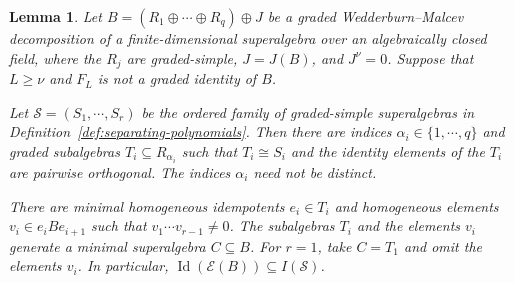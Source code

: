 \documentclass[11pt,reqno]{amsart}
\newcommand{\E}{\mathcal E}
\newcommand{\Id}{\operatorname{Id}}
\newtheorem{lemma}[theorem]{Lemma}
\theoremstyle{definition}
\theoremstyle{remark}
\numberwithin{equation}{section}
\begin{document}
\begin{lemma}\label{lem:extraction}
Let
$B=(R_1\oplus\cdots\oplus R_q)\oplus J$
be a graded Wedderburn--Malcev decomposition of a finite-dimensional
superalgebra over an algebraically closed field,
where the $R_j$ are graded-simple, $J=J(B)$, and $J^\nu=0$.
Suppose that $L\geq\nu$ and $F_L$ is not a graded identity
of $B$.

Let $\mathcal S=(S_1,\cdots,S_r)$ be the ordered family
of graded-simple superalgebras in
Definition~\ref{def:separating-polynomials}. Then there are indices $\alpha_i\in\{1,\cdots,q\}$
and graded subalgebras $T_i\subseteq R_{\alpha_i}$
such that $T_i\cong S_i$ and the identity elements
of the $T_i$ are pairwise orthogonal.
The indices $\alpha_i$ need not be distinct.

There are minimal homogeneous idempotents $e_i\in T_i$
and homogeneous elements $v_i\in e_iBe_{i+1}$
such that $v_1\cdots v_{r-1}\ne0$.
The subalgebras $T_i$ and the elements $v_i$ generate
a minimal superalgebra $C\subseteq B$. For $r=1$, take $C=T_1$ and omit the elements $v_i$. In particular, $
\Id(\E(B))\subseteq I(\mathcal S)$.


\end{lemma}
\end{document}
